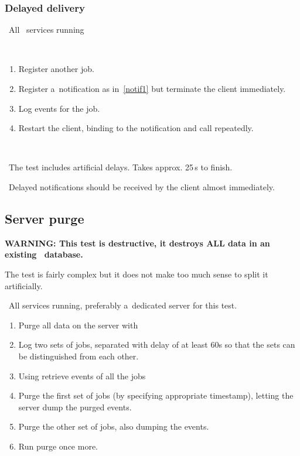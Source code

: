 


\subsubsection{Delayed delivery}

\req\ All \LB\ services running

\what\
\begin{enumerate}
\item Register another job.
\item Register a~notification as in~\ref{notif1} but terminate the client
immediately.
\item Log events for the job.
\item Restart the client, binding to the notification and call
 repeatedly.
\end{enumerate}

\how\ 

\note\ The test includes artificial delays. Takes approx. 25\,s to finish.

\result\ Delayed notifications should be received by the client almost
immediately.




\subsection{Server purge}

\textbf{WARNING: This test is destructive, it destroys ALL data in an
existing \LB\ database.}

The test is fairly complex but it does not make too much sense to split it
artificially.

\req\ All \LB services running, preferably a~dedicated server for this test.

\what
\begin{enumerate}
\item Purge all data on the server with 
\item Log two sets of jobs, separated with delay of at least 60s so
that the sets can be distinguished from each other.
\item \label{purgel}
Using  retrieve events of all the jobs
\item \label{purge1}
Purge the first set of jobs (by specifying appropriate timestamp),
letting the server dump the purged events.
\item \label{purge2} Purge the other set of jobs, also dumping the events.
\item \label{purge3} Run purge once more.
\end{enumerate}

